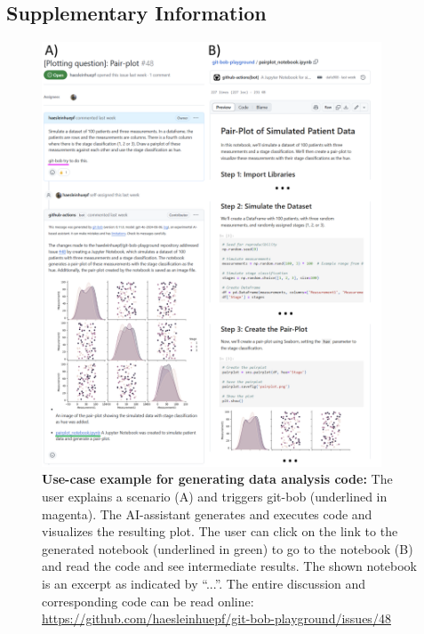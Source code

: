 \documentclass[sn-mathphys-num]{sn-jnl}%
\theoremstyle{thmstyleone}%
\theoremstyle{thmstyletwo}%
\theoremstyle{thmstylethree}%
\begin{document}
\begin{appendices}




\onecolumn
\newpage

\section*{Supplementary Information}
\setcounter{figure}{0} 
\renewcommand{\figurename}{}
\renewcommand{\thefigure}{Supplementary Figure \arabic{figure}}


\begin{figure}[h]
\centering
\includegraphics[width=0.9\textwidth]{example_pair_plot.png}
\caption{\textbf{Use-case example for generating data analysis code:} The user explains a scenario (A) and triggers git-bob (underlined in magenta). The AI-assistant generates and executes code and visualizes the resulting plot. The user can click on the link to the generated notebook (underlined in green) to go to the notebook (B) and read the code and see intermediate results. The shown notebook is an excerpt as indicated by ``...''. The entire discussion and corresponding code can be read online: \url{https://github.com/haesleinhuepf/git-bob-playground/issues/48}
\newline
\newline
}
\label{fig:examplepairplot}
\end{figure}



\end{appendices}
\end{document}
